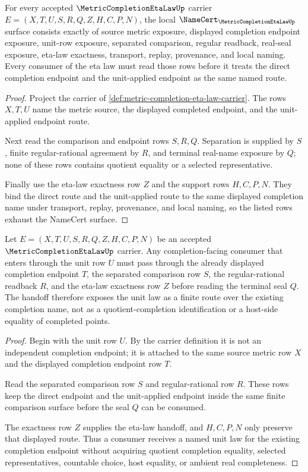 \begin{theorem}
\label{thm:metric-completion-eta-law-namecert-obligations}
For every accepted $\MetricCompletionEtaLawUp$ carrier $E=(X,T,U,S,R,Q,Z,H,C,P,N)$, the local $\NameCert_{\MetricCompletionEtaLawUp}$ surface consists exactly of source metric exposure, displayed completion endpoint exposure, unit-row exposure, separated comparison, regular readback, real-seal exposure, eta-law exactness, transport, replay, provenance, and local naming. Every consumer of the eta law must read those rows before it treats the direct completion endpoint and the unit-applied endpoint as the same named route.
\end{theorem}
\begin{proof}
Project the carrier of \autoref{def:metric-completion-eta-law-carrier}. The rows $X,T,U$ name the metric source, the displayed completed endpoint, and the unit-applied endpoint route.

Next read the comparison and endpoint rows $S,R,Q$. Separation is supplied by $S$, finite regular-rational agreement by $R$, and terminal real-name exposure by $Q$; none of these rows contains quotient equality or a selected representative.

Finally use the eta-law exactness row $Z$ and the support rows $H,C,P,N$. They bind the direct route and the unit-applied route to the same displayed completion name under transport, replay, provenance, and local naming, so the listed rows exhaust the NameCert surface.
\end{proof}

\begin{theorem}
\label{thm:metric-completion-eta-law-unit-handoff}
Let $E=(X,T,U,S,R,Q,Z,H,C,P,N)$ be an accepted $\MetricCompletionEtaLawUp$ carrier. Any completion-facing consumer that enters through the unit row $U$ must pass through the already displayed completion endpoint $T$, the separated comparison row $S$, the regular-rational readback $R$, and the eta-law exactness row $Z$ before reading the terminal seal $Q$. The handoff therefore exposes the unit law as a finite route over the existing completion name, not as a quotient-completion identification or a host-side equality of completed points.
\end{theorem}
\begin{proof}
Begin with the unit row $U$. By the carrier definition it is not an independent completion endpoint; it is attached to the same source metric row $X$ and the displayed completion endpoint row $T$.

Read the separated comparison row $S$ and regular-rational row $R$. These rows keep the direct endpoint and the unit-applied endpoint inside the same finite comparison surface before the seal $Q$ can be consumed.

The exactness row $Z$ supplies the eta-law handoff, and $H,C,P,N$ only preserve that displayed route. Thus a consumer receives a named unit law for the existing completion endpoint without acquiring quotient completion equality, selected representatives, countable choice, host equality, or ambient real completeness.
\end{proof}

